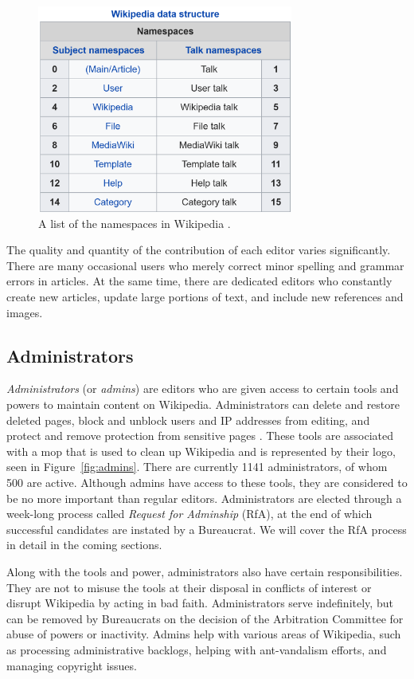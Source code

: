 \begin{figure}[htp]
    \centering
    \includegraphics[width=0.75\textwidth]{images/namespaces.PNG}
    \caption{A list of the namespaces in Wikipedia \cite{wiki:namespace}.}
    \label{fig:namespace}
\end{figure}

The quality and quantity of the contribution of each editor varies significantly.
There are many occasional users who merely correct minor spelling and grammar errors in articles.
At the same time, there are dedicated editors who constantly create new articles, update large portions of text, and include new references and images.   

\subsection{Administrators}
\textit{Administrators} (or \textit{admins}) are editors who are given access to certain tools and powers to maintain content on Wikipedia.
Administrators can delete and restore deleted pages, block and unblock users and IP addresses from editing, and protect and remove protection from sensitive pages \cite{wiki:admins}.
These tools are associated with a mop that is used to clean up Wikipedia and is represented by their logo, seen in Figure~\ref{fig:admins}. 
There are currently 1141 administrators, of whom 500 are active.
Although admins have access to these tools, they are considered to be no more important than regular editors.
Administrators are elected through a week-long process called \textit{Request for Adminship} (RfA), at the end of which successful candidates are instated by a Bureaucrat.
We will cover the RfA process in detail in the coming sections. 

Along with the tools and power, administrators also have certain responsibilities.
They are not to misuse the tools at their disposal in conflicts of interest or disrupt Wikipedia by acting in bad faith.
Administrators serve indefinitely, but can be removed  by Bureaucrats on the decision of the Arbitration Committee for abuse of powers or inactivity.
Admins help with various areas of Wikipedia, such as processing administrative backlogs, helping with ant-vandalism efforts, and managing copyright issues. 

